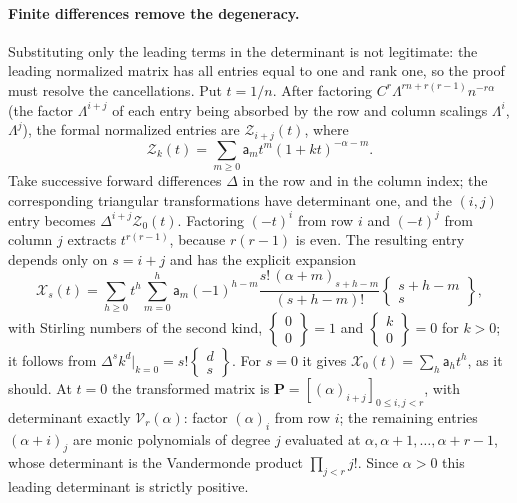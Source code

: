 \documentclass[11pt,letterpaper]{article}
\theoremstyle{remark}\newtheorem{remark}[theorem]{Remark}
\newcommand{\stir}[2]{\left\{\begin{matrix}#1\\#2\end{matrix}\right\}}
\newcounter{l7gtrsavedeq}
\begin{document}
\paragraph{Finite differences remove the degeneracy.}
Substituting only the leading terms in the determinant is not legitimate:
the leading normalized matrix has all entries equal to one and rank one, so
the proof must resolve the cancellations. Put $t=1/n$. After factoring
$C^r\Lambda^{rn+r(r-1)}n^{-r\alpha}$ (the factor $\Lambda^{i+j}$ of each
entry being absorbed by the row and column scalings $\Lambda^i$,
$\Lambda^j$), the formal normalized entries are $\mathcal Z_{i+j}(t)$, where
\[
 \mathcal Z_k(t)=\sum_{m\ge0}\mathsf a_mt^m(1+kt)^{-\alpha-m}.
\]
Take successive forward differences $\Delta$ in the row and in the column
index; the corresponding triangular transformations have determinant one,
and the $(i,j)$ entry becomes $\Delta^{i+j}\mathcal Z_0(t)$. Factoring
$(-t)^i$ from row $i$ and $(-t)^j$ from column $j$ extracts $t^{r(r-1)}$,
because $r(r-1)$ is even. The resulting entry depends only on $s=i+j$ and
has the explicit expansion
\begin{equation}\label{l7g:hp:eq:Kgenerator}
 \mathcal X_s(t)=\sum_{h\ge0}t^h\sum_{m=0}^{h}\mathsf a_m(-1)^{h-m}
 \frac{s!\,(\alpha+m)_{s+h-m}}{(s+h-m)!}\stir{s+h-m}{s},
\end{equation}
with Stirling numbers of the second kind, $\stir00=1$ and $\stir k0=0$ for
$k>0$; it follows from $\Delta^sk^d|_{k=0}=s!\stir ds$. For $s=0$ it gives
$\mathcal X_0(t)=\sum_h\mathsf a_ht^h$, as it should. At $t=0$ the
transformed matrix is $\mathbf P=[(\alpha)_{i+j}]_{0\le i,j<r}$, with
determinant exactly $\mathcal V_r(\alpha)$: factor $(\alpha)_i$ from row
$i$; the remaining entries $(\alpha+i)_j$ are monic polynomials of degree
$j$ evaluated at $\alpha,\alpha+1,\dots,\alpha+r-1$, whose determinant is
the Vandermonde product $\prod_{j<r}j!$. Since $\alpha>0$ this leading
determinant is strictly positive.
\end{document}
